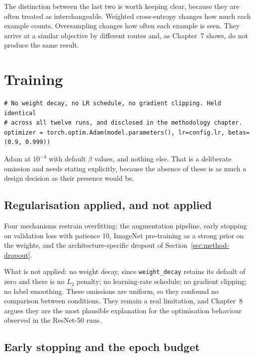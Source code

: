 The distinction between the last two is worth keeping clear, because they are often
treated as interchangeable. Weighted cross-entropy changes how much each example counts.
Oversampling changes how often each example is seen. They arrive at a similar objective
by different routes and, as Chapter~7 shows, do not produce the same result.

\section{Training}
\label{sec:method-training}

\begin{lstlisting}[caption={Optimiser construction, \texttt{src/ham10000/train.py}.},
                   label={lst:optim}]
# No weight decay, no LR schedule, no gradient clipping. Held identical
# across all twelve runs, and disclosed in the methodology chapter.
optimizer = torch.optim.Adam(model.parameters(), lr=config.lr, betas=(0.9, 0.999))
\end{lstlisting}

Adam at $10^{-3}$ with default $\beta$ values, and nothing else. That is a deliberate
omission and needs stating explicitly, because the absence of these is as much a design
decision as their presence would be.

\subsection{Regularisation applied, and not applied}
\label{sec:method-regularisation}

Four mechanisms restrain overfitting: the augmentation pipeline, early stopping on
validation loss with patience 10, ImageNet pre-training as a strong prior on the
weights, and the architecture-specific dropout of
Section~\ref{sec:method-dropout}.

What is not applied: no weight decay, since \texttt{weight\_decay} retains its default
of zero and there is no $L_2$ penalty; no learning-rate schedule; no gradient clipping;
no label smoothing. These omissions are uniform, so they confound no comparison between
conditions. They remain a real limitation, and Chapter~8 argues they are the most
plausible explanation for the optimisation behaviour observed in the ResNet-50 runs.

\subsection{Early stopping and the epoch budget}

